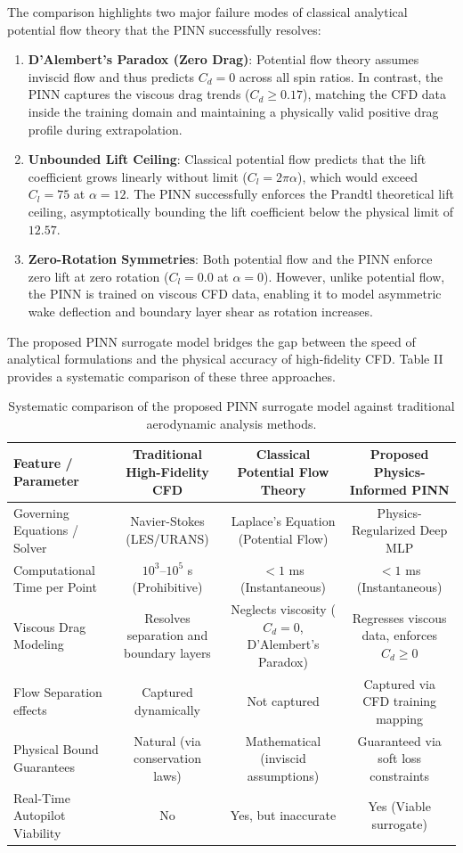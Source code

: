 \documentclass[aip,pof,reprint,onecolumn,amsmath,amssymb,graphicx,longbibliography]{revtex4-2}
\begin{document}
The comparison highlights two major failure modes of classical analytical potential flow theory that the PINN successfully resolves:
\begin{enumerate}
    \item \textbf{D'Alembert's Paradox (Zero Drag)}: Potential flow theory assumes inviscid flow and thus predicts $C_d = 0$ across all spin ratios. In contrast, the PINN captures the viscous drag trends ($C_d \ge 0.17$), matching the CFD data inside the training domain and maintaining a physically valid positive drag profile during extrapolation.
    \item \textbf{Unbounded Lift Ceiling}: Classical potential flow predicts that the lift coefficient grows linearly without limit ($C_l = 2\pi\alpha$), which would exceed $C_l = 75$ at $\alpha = 12$. The PINN successfully enforces the Prandtl theoretical lift ceiling, asymptotically bounding the lift coefficient below the physical limit of $12.57$.
    \item \textbf{Zero-Rotation Symmetries}: Both potential flow and the PINN enforce zero lift at zero rotation ($C_l = 0.0$ at $\alpha = 0$). However, unlike potential flow, the PINN is trained on viscous CFD data, enabling it to model asymmetric wake deflection and boundary layer shear as rotation increases.
\end{enumerate}

The proposed PINN surrogate model bridges the gap between the speed of analytical formulations and the physical accuracy of high-fidelity CFD. Table II provides a systematic comparison of these three approaches.

\begin{table}[h]
\centering
\caption{Systematic comparison of the proposed PINN surrogate model against traditional aerodynamic analysis methods.}
\begin{tabular}{lccc}
\hline \hline
Feature / Parameter & Traditional High-Fidelity CFD & Classical Potential Flow Theory & Proposed Physics-Informed PINN \\ \hline
Governing Equations / Solver & Navier-Stokes (LES/URANS) & Laplace's Equation (Potential Flow) & Physics-Regularized Deep MLP \\
Computational Time per Point & $10^3$--$10^5$ s (Prohibitive) & $< 1$ ms (Instantaneous) & $< 1$ ms (Instantaneous) \\
Viscous Drag Modeling & Resolves separation and boundary layers & Neglects viscosity ($C_d = 0$, D'Alembert's Paradox) & Regresses viscous data, enforces $C_d \ge 0$ \\
Flow Separation effects & Captured dynamically & Not captured & Captured via CFD training mapping \\
Physical Bound Guarantees & Natural (via conservation laws) & Mathematical (inviscid assumptions) & Guaranteed via soft loss constraints \\
Real-Time Autopilot Viability & No & Yes, but inaccurate & Yes (Viable surrogate) \\ \hline \hline
\end{tabular}
\end{table}
\end{document}
